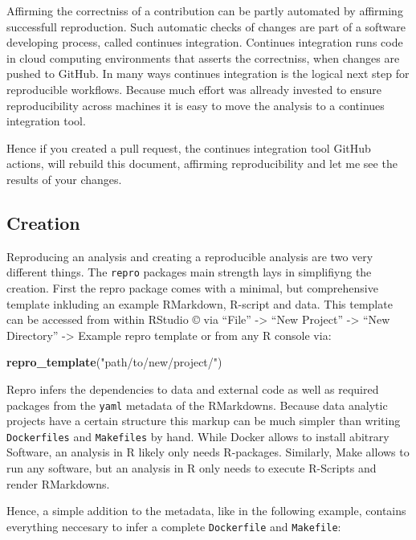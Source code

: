 \documentclass[12pt,a4paper,]{article}
\newenvironment{Shaded}{\begin{snugshade}}{\end{snugshade}}
\newcommand{\KeywordTok}[1]{\textcolor[rgb]{0.13,0.29,0.53}{\textbf{#1}}}
\newcommand{\NormalTok}[1]{#1}
\newcommand{\StringTok}[1]{\textcolor[rgb]{0.31,0.60,0.02}{#1}}
\begin{document}
Affirming the correctniss of a contribution can be partly automated by affirming successfull reproduction.
Such automatic checks of changes are part of a software developing process, called continues integration.
Continues integration runs code in cloud computing environments that asserts the correctniss, when changes are pushed to GitHub.
In many ways continues integration is the logical next step for reproducible workflows.
Because much effort was allready invested to ensure reproducibility across machines it is easy to move the analysis to a continues integration tool.

Hence if you created a pull request, the continues integration tool GitHub actions, will rebuild this document, affirming reproducibility and let me see the results of your changes.

\hypertarget{creation}{%
\subsection{Creation}\label{creation}}

Reproducing an analysis and creating a reproducible analysis are two very different things.
The \texttt{repro} packages main strength lays in simplifiyng the creation.
First the repro package comes with a minimal, but comprehensive template inkluding an example RMarkdown, R-script and data.
This template can be accessed from within RStudio © via ``File'' -\textgreater{} ``New Project'' -\textgreater{} ``New Directory'' -\textgreater{} Example repro template or from any R console via:

\begin{Shaded}
\begin{Highlighting}[]
\KeywordTok{repro_template}\NormalTok{(}\StringTok{"path/to/new/project/"}\NormalTok{)}
\end{Highlighting}
\end{Shaded}

Repro infers the dependencies to data and external code as well as required packages from the \texttt{yaml} metadata of the RMarkdowns.
Because data analytic projects have a certain structure this markup can be much simpler than writing \texttt{Dockerfiles} and \texttt{Makefiles} by hand.
While Docker allows to install abitrary Software, an analysis in R likely only needs R-packages. Similarly, Make allows to run any software, but an analysis in R only needs to execute R-Scripts and render RMarkdowns.

Hence, a simple addition to the metadata, like in the following example, contains everything neccesary to infer a complete \texttt{Dockerfile} and \texttt{Makefile}:
\end{document}
